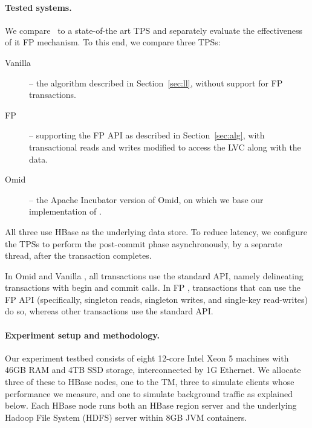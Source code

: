 

\paragraph{Tested systems.}

We compare \sys\  to a state-of-the art TPS and separately evaluate the effectiveness of it FP mechanism.
To this end, we compare three TPSs: 
\begin{description}
\item[Vanilla \sys] -- the algorithm described in Section~\ref{sec:ll}, without support for FP transactions.
\item[FP \sys] -- supporting the FP API as described in Section~\ref{sec:alg},
with transactional reads and writes  modified to access the LVC along with the data.
\item[Omid] -- the Apache Incubator version of Omid, on which we base
our implementation of \sys. 
\end{description}

All three use HBase as the underlying data store. To reduce latency,
we configure the TPSs to perform the post-commit phase asynchronously, 
by a separate thread, after the transaction completes.

In Omid and Vanilla \sys, all transactions use the standard API, namely 
delineating transactions with begin and commit calls.
In FP \sys, transactions that can use the FP API (specifically, singleton reads, singleton writes, 
and single-key read-writes) do so, whereas other transactions use the standard API.

\paragraph{Experiment setup and methodology.}

Our experiment testbed consists of eight 12-core Intel Xeon 5 machines with 46GB RAM and 4TB 
SSD storage, interconnected by 1G Ethernet. We allocate three of these to HBase nodes, 
one to the TM,
three to simulate clients whose performance we measure, and one to simulate background traffic
as explained below. 
Each HBase node runs both an HBase region server and the underlying 
Hadoop File System (HDFS) server within 8GB JVM containers. 

